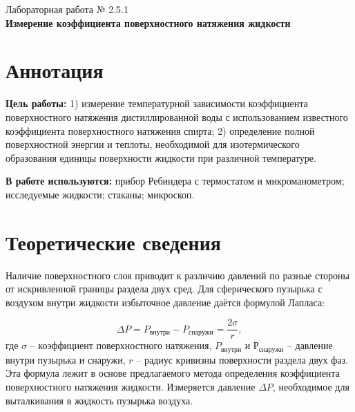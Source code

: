 \documentclass[a4paper,12pt]{article} %
\begin{document}
\begin{center}   
	\large{Лабораторная работа № 2.5.1\\\textbf{Измерение коэффициента поверхностного натяжения жидкости}}\\
\end{center}

\section{Аннотация}


	\noindent\textbf{Цель работы:}
	1) измерение температурной зависимости  коэффициента поверхностного натяжения дистиллированной воды с использованием известного коэффициента поверхностного натяжения спирта; 2) определение полной поверхностной энергии  и теплоты, необходимой для изотермического образования единицы  поверхности жидкости  при различной температуре.
	
	\bigskip
	\noindent\textbf{В работе используются:} прибор  Ребиндера  с термостатом и микроманометром; исследуемые жидкости; стаканы; микроскоп.

\section{Теоретические сведения}

Наличие поверхностного слоя приводит к различию давлений по разные стороны от искривленной границы раздела двух сред.  Для сферического пузырька с воздухом  внутри жидкости избыточное давление даётся формулой Лапласа:

\begin{equation}
\Delta P = P_{внутри}- P_{снаружи}=\frac{2\sigma}{r}, 
\end{equation}
где $\sigma$ -- коэффициент поверхностного натяжения, $P_{внутри}$ и $Р_{снаружи}$ -- давление внутри пузырька и снаружи, $r$ -- радиус кривизны поверхности раздела двух фаз. Эта формула лежит в основе предлагаемого метода определения коэффициента поверхностного натяжения жидкости. Измеряется давление $\Delta P$, необходимое для выталкивания в жидкость пузырька воздуха.
\end{document}
